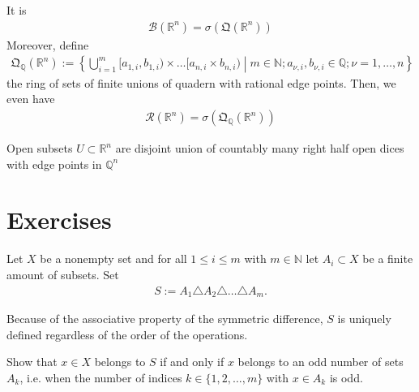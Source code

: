 \begin{theorem}
    It is
    \begin{align}
        \mathcal{B}(\mathbb{R}^n) = \sigma(\mathfrak{Q}(\mathbb{R}^n))
    \end{align}
    Moreover, define
    \begin{align}
        \mathfrak{Q}_{\mathbb{Q}}(\mathbb{R}^n) := \left\{ \bigcup_{i=1}^m [a_{1, i}, b_{1, i}) \times \dots [a_{n, i} \times b_{n, i}) \middle| m \in \mathbb{N}; a_{\nu, i}, b_{\nu, i} \in \mathbb{Q}; \nu = 1, \dots, n \right\}
    \end{align}
    the ring of sets of finite unions of quadern with rational edge points. Then, we even have
    \begin{align}
        \mathcal{R}(\mathbb{R}^n) = \sigma( \mathfrak{Q}_{\mathbb{Q}} (\mathbb{R}^n))
    \end{align}
\end{theorem}
\begin{lemma}
    Open subsets \(U \subset \mathbb{R}^n\) are disjoint union of countably many right half open dices with edge points in \(\mathbb{Q}^n\)
\end{lemma}
%
%
%
\section{Exercises}
\begin{question}
    Let \(X\) be a nonempty set and for all \(1 \leq i \leq m\) with \(m \in \mathbb{N}\) let \(A_i \subset X\) be a finite amount of subsets. Set
    \begin{align}
        S := A_1 \triangle A_2 \triangle \dots \triangle A_m \text{.}
    \end{align}

    Because of the associative property of the symmetric difference, \(S\) is uniquely defined regardless of the order of the operations.

    Show that \(x \in X\) belongs to \(S\) if and only if \(x\) belongs to an odd number of sets \(A_k\), i.e. when the number of indices \(k \in \{1, 2, \dots, m\}\) with \(x \in A_k\) is odd.
\end{question}
\begin{solution}
\end{solution}